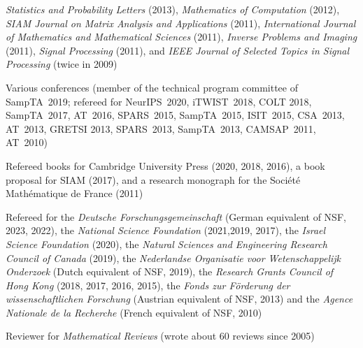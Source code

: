 \documentclass[11pt]{article}
\begin{document}
{\sl Statistics and Probability Letters} (2013),
{\sl Mathematics of Computation} (2012),
{\sl SIAM Journal on Matrix Analysis and Applications} (2011),
{\sl International Journal of Mathematics and Mathematical Sciences} (2011),
{\sl Inverse Problems and Imaging} (2011),
{\sl Signal Processing} (2011),
and
{\sl IEEE Journal of Selected Topics in Signal Processing} (twice in 2009)
\item Various conferences 
(member of the technical program committee of SampTA~2019;
refereed for NeurIPS~2020,
 iTWIST~2018, COLT 2018, SampTA~2017, AT~2016, SPARS~2015, SampTA~2015, ISIT~2015, CSA~2013, AT~2013, GRETSI 2013, SPARS~2013, SampTA~2013, CAMSAP~2011, AT~2010)
\item Refereed 
books for Cambridge University Press (2020, 2018, 2016),
a book proposal for SIAM (2017),
and a research monograph for the Soci\'{e}t\'{e} Math\'{e}matique de France (2011)
\item Refereed for the 
{\sl Deutsche Forschungsgemeinschaft} (German equivalent of NSF, 2023, 2022),
the
{\sl National Science Foundation} (2021,2019, 2017),
the
{\sl Israel Science Foundation} (2020),
the
{\sl Natural Sciences and Engineering Research Council of Canada} (2019),
the
{\sl Nederlandse Organisatie voor Wetenschappelijk Onderzoek} (Dutch equivalent of NSF, 2019),
the
{\sl Research Grants Council of Hong Kong} (2018, 2017, 2016, 2015),
the 
{\sl Fonds zur F\"orderung der wissenschaftlichen Forschung} (Austrian equivalent of NSF, 2013) 
and the
 {\sl Agence Nationale de la Recherche} (French equivalent of NSF, 2010)
\item Reviewer for {\sl Mathematical Reviews} (wrote about 60 reviews since 2005)
 \eitemize
 
 \vspace{0mm}
 
\end{document}
